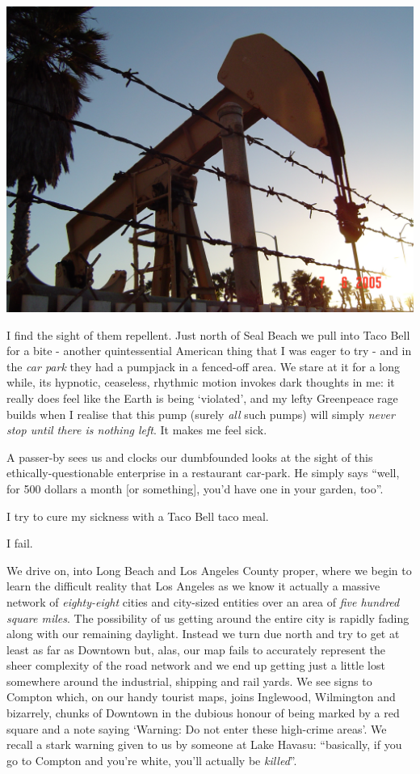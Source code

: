 \documentclass[a5paper,titlepage,11pt,draft]{book}
\begin{document}
\begin{center}\includegraphics[width=\textwidth]{gfx/pumpjack}\end{center}

I find the sight of them repellent.  Just north of Seal Beach we pull into Taco Bell for a bite - another quintessential American thing that I was eager to try - and in the \emph{car park} they had a pumpjack in a fenced-off area.  We stare at it for a long while, its hypnotic, ceaseless, rhythmic motion invokes dark thoughts in me: it really does feel like the Earth is being `violated', and my lefty Greenpeace rage builds when I realise that this pump (surely \emph{all} such pumps) will simply \emph{never stop until there is nothing left}.  It makes me feel sick.

A passer-by sees us and clocks our dumbfounded looks at the sight of this ethically-questionable enterprise in a restaurant car-park.  He simply says ``well, for 500 dollars a month {\footnotesize [or something]}, you'd have one in your garden, too''.

I try to cure my sickness with a Taco Bell taco meal.

I fail.

We drive on, into Long Beach and Los Angeles County proper, where we begin to learn the difficult reality that Los Angeles as we know it actually a massive network of \emph{eighty-eight} cities and city-sized entities over an area of \emph{five hundred square miles}.  The possibility of us getting around the entire city is rapidly fading along with our remaining daylight.  Instead we turn due north and try to get at least as far as Downtown but, alas, our map fails to accurately represent the sheer complexity of the road network and we end up getting just a little lost somewhere around the industrial, shipping and rail yards.  We see signs to Compton which, on our handy tourist maps, joins Inglewood, Wilmington and bizarrely, chunks of Downtown in the dubious honour of being marked by a red square and a note saying `Warning: Do not enter these high-crime areas'.  We recall a stark warning given to us by someone at Lake Havasu:  ``basically, if you go to Compton and you're white, you'll actually be \emph{killed}''.
\end{document}
